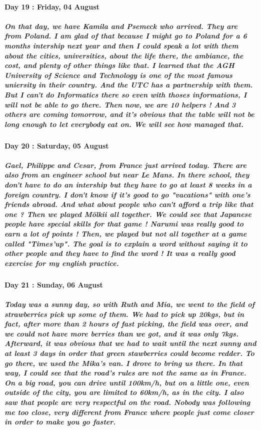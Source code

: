 \documentclass[a4paper,12pt]{report} %
\begin{document}
\paragraph{Day 19 : Friday, 04 August}
\subparagraph{On that day, we have Kamila and Psemeck who arrived. They are from Poland. I am glad of that because I might go to Poland for a 6 months intership next year and then I could speak a lot with them about the cities, universities, about the life there, the ambiance, the cost, and plenty of other things like that. I learned that the AGH University of Science and Technology is one of the most famous uniersity in their country. And the UTC has a partnership with them. But I can't do Informatics there so even with thoses informations, I will not be able to go there. Then now, we are 10 helpers ! And 3 others are coming tomorrow, and it's obvious that the table will not be long enough to let everybody eat on. We will see how managed that.}

\paragraph{Day 20 : Saturday, 05 August}
\subparagraph{Gael, Philippe and Cesar, from France just arrived today. There are also from an engineer school but near Le Mans. In there school, they don't have to do an intership but they have to go at least 8 weeks in a foreign country. I don't know if it's good to go "vacations" with one's friends abroad. And what about people who can't afford a trip like that one ? Then we played Mölkii all together. We could see that Japanese people have special skills for that game ! Narumi was really good to earn a lot of points ! Then, we played but not all together at a game called "Times'up". The goal is to explain a word without saying it to other people and they have to find the word ! It was a really good exercise for my english practice.}

\paragraph{Day 21 : Sunday, 06 August}
\subparagraph{Today was a sunny day, so with Ruth and Mia, we went to the field of strawberries pick up some of them. We had to pick up 20kgs, but in fact, after more than 2 hours of fast picking, the field was over, and we could not have more berries than we got, and it was only 7kgs. Afterward, it was obvious that we had to wait until the next sunny and at least 3 days in order that green stawberries could become redder. To go there, we used the Mika's van. I drove to bring us there. In that way, I could see that the road's rules are not the same as in France. On a big road, you can drive until 100km/h, but on a little one, even outside of the city, you are limited to 60km/h, as in the city. I also saw that people are very respectful on the road. Nobody was following me too close, very different from France where people just come closer in order to make you go faster.}
\end{document}
